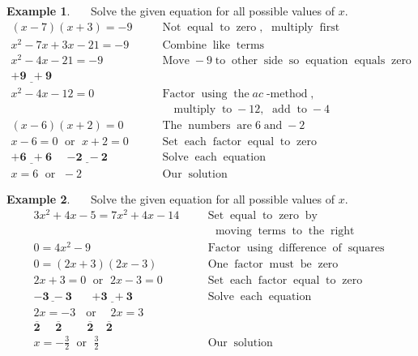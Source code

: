 \documentclass[12pt]{book}
\theoremstyle{definition}
\newtheorem{example}{Example}
\newcommand{\tmmathbf}[1]{\ensuremath{\boldsymbol{#1}}}
\newcommand{\tmop}[1]{\ensuremath{\operatorname{#1}}}
\begin{document}
\begin{example}~~~Solve the given equation for all possible values of $x$.
  \begin{eqnarray*}
    (x - 7) (x + 3) = - 9~~~ &  & \tmop{Not} \tmop{equal} \tmop{to} \tmop{zero},
    \tmop{~multiply} \tmop{first}\\
    x^2 - 7 x + 3 x - 21 = - 9~~~ &  & \tmop{Combine} \tmop{like} \tmop{terms}\\
    x^2 - 4 x - 21 = - 9~~~ &  & \tmop{Move} - 9 \tmop{to} \tmop{other}
    \tmop{side} \tmop{so} \tmop{equation} \tmop{equals} \tmop{zero}\\
    \tmmathbf{\underline{+ 9 ~~+ 9}}~~~ &  & \\
    x^2 - 4 x - 12 = 0~~~~~ &  & \tmop{Factor} \tmop{using} \tmop{the} ac
    \tmop{-method},\\
		&&\tmop{~~~multiply} \tmop{to} - 12, \tmop{~add} \tmop{to} - 4\\
    (x - 6) (x + 2) = 0~~~~~ &  & \tmop{The} \tmop{numbers} \tmop{are} 6 \tmop{and}
    - 2\\
    x - 6 = 0 \tmop{~or~} x + 2 = 0~~~~~ &  & \tmop{Set} \tmop{each} \tmop{factor}
    \tmop{equal} \tmop{to} \tmop{zero}\\
    \tmmathbf{\underline{+ 6 ~~+ 6} ~~~~~~ \underline{- 2 ~~- 2}}~~ &  & \tmop{Solve} \tmop{each}
    \tmop{equation}\\
    x = 6 \tmop{~or~} - 2~~~~~~~ &  & \tmop{Our} \tmop{solution}
  \end{eqnarray*}
\end{example}
\begin{example}~~~Solve the given equation for all possible values of $x$.
  \begin{eqnarray*}
    3 x^2 + 4 x - 5 = 7 x^2 + 4 x - 14~~~ &  & \tmop{Set} \tmop{equal} \tmop{to}
    \tmop{zero} \tmop{by}\\
		&&~~~\tmop{moving} \tmop{terms} \tmop{to} \tmop{the} \tmop{right}\\
    0 = 4 x^2 - 9~~~ &  & \tmop{Factor} \tmop{using} \tmop{difference} \tmop{of}
    \tmop{squares}\\
    0 = (2 x + 3) (2 x - 3)~~~ &  & \tmop{One} \tmop{factor} \tmop{must}
    \tmop{be} \tmop{zero}\\
    2 x + 3 = 0 \tmop{~or~} 2 x - 3 = 0~~~ &  & \tmop{Set} \tmop{each}
    \tmop{factor} \tmop{equal} \tmop{to} \tmop{zero}\\
    \tmmathbf{\underline{- 3 ~- 3} ~~~~~~~~ \underline{+ 3 ~~+ 3}} &  & \tmop{Solve} \tmop{each}
    \tmop{equation}\\
    2 x = - 3 \tmop{~~or~~~} 2 x = 3~~~ &  	& \\
    \tmmathbf{\overline{2} ~~~~~~ \overline{2} ~~~~~~~~~~ \overline{2} ~~~~~ \overline{2}}~~~ &  & \\
    x = -\frac{3}{2} \tmop{~or~} \frac{3}{2}~~~~~ &  & \tmop{Our} \tmop{solution}
  \end{eqnarray*}
\end{example}
\end{document}
